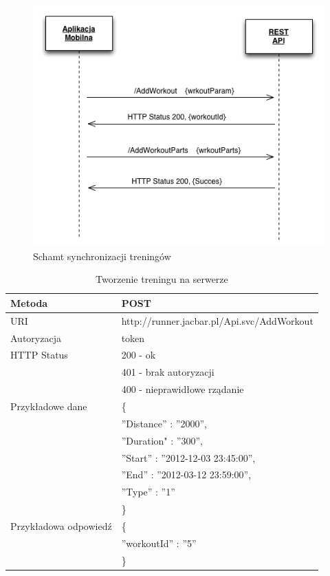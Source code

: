 \begin{figure}[ht]
	\centering
		\includegraphics[width=1\linewidth]{assets/workout_parts.png}
		\caption{Schamt synchronizacji treningów}
	\label{fig:workout_parts}
\end{figure}

\begin{table}
 \label{workout}
  \caption{Tworzenie treningu na serwerze}
  \begin{center}
  \begin{tabular}{| l | l |}
  	\hline
  	Metoda & POST \\ \hline
  	URI & http://runner.jacbar.pl/Api.svc/AddWorkout \\ \hline
  	Autoryzacja & token \\ \hline
  	HTTP Status & 200 - ok \\
                & 401 - brak autoryzacji \\
                & 400 - nieprawidłowe rządanie \\ \hline
    Przykładowe dane & \{ \\
    								 & \quad ''Distance'' : ''2000'', \\
    								 & \quad ''Duration" : ''300'', \\
    								 & \quad ''Start'' : ''2012-12-03 23:45:00'', \\
    								 & \quad ''End'' : ''2012-03-12 23:59:00'', \\
    								 & \quad ''Type'' : ''1'' \\ 
    								 & \} \\ \hline
    Przykładowa odpowiedź & \{ \\
                          & \quad ''workoutId'' : ''5'' \\
                          & \} \\ \hline
  \end{tabular}
  \end{center}
\end{table}


